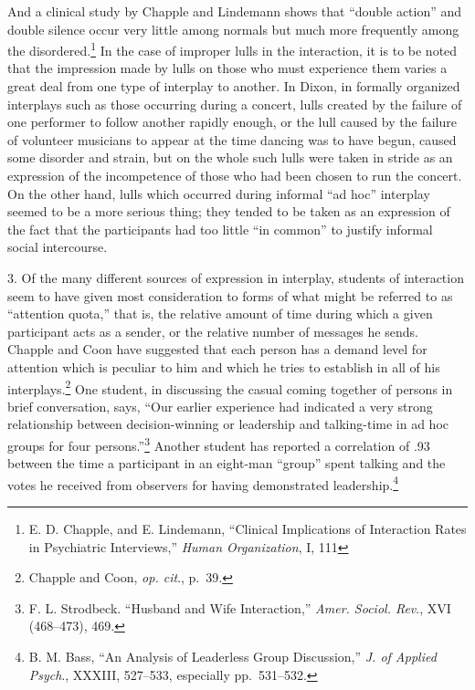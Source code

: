 \documentclass[twoside,symmetric,nobib,justified]{tufte-book}
\begin{document}
\noindent And a clinical study by Chapple and Lindemann shows that ``double
action'' and double silence occur very little among normals but much
more frequently among the disordered.\footnote{E. D. Chapple, and E.
  Lindemann, ``Clinical Implications of Interaction Rates in Psychiatric
  Interviews,'' \emph{Human Organization}, I, 111} In the case of
improper lulls in the interaction, it is to be noted that the impression
made by lulls on those who must experience them varies a great deal from
one type of interplay to another. In Dixon, in formally organized
interplays such as those occurring during a concert, lulls created by
the failure of one performer to follow another rapidly enough, or the
lull caused by the failure of volunteer musicians to appear at the time
dancing was to have begun, caused some disorder and strain, but on the
whole such lulls were taken in stride as an expression of the
incompetence of those who had been chosen to run the concert. On the
other hand, lulls which occurred during informal ``ad hoc'' interplay
seemed to be a more serious thing; they tended to be taken as an
expression of the fact that the participants had too little ``in
common'' to justify informal social intercourse.

3. Of the many different sources of expression in
interplay, students of interaction seem to have given most consideration
to forms of what might be referred to as ``attention quota,'' that is,
the relative amount of time during which a given participant acts as a
sender, or the relative number of messages he sends. Chapple and Coon
have suggested that each person has a demand level for attention which
is peculiar to him and which he tries to establish in all of his
interplays.\footnote{Chapple and Coon, \emph{op. cit}., p.~39.} One
student, in discussing the casual coming together of persons in brief
conversation, says, ``Our earlier experience had indicated a very strong
relationship between decision-winning or leadership and talking-time in
ad hoc groups for four persons.''\footnote{F. L. Strodbeck. ``Husband
  and Wife Interaction,'' \emph{Amer. Sociol. Rev}., XVI (468--473),
  469.} Another student has reported a correlation of .93 between the
time a participant in an eight-man ``group'' spent talking and the votes
he received from observers for having demonstrated
leadership.\footnote{B. M. Bass, ``An Analysis of Leaderless Group
  Discussion,'' \emph{J. of Applied Psych}., XXXIII, 527--533,
  especially pp.~531--532.}
\end{document}
